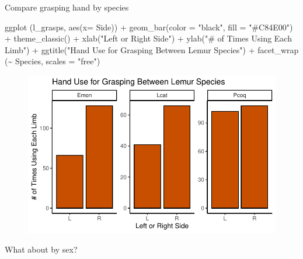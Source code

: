 \documentclass[
  letterpaper,
  DIV=11,
  numbers=noendperiod]{scrartcl}
\newenvironment{Shaded}{\begin{snugshade}}{\end{snugshade}}
\newcommand{\AttributeTok}[1]{\textcolor[rgb]{0.40,0.45,0.13}{#1}}
\newcommand{\FunctionTok}[1]{\textcolor[rgb]{0.28,0.35,0.67}{#1}}
\newcommand{\NormalTok}[1]{\textcolor[rgb]{0.00,0.23,0.31}{#1}}
\newcommand{\SpecialCharTok}[1]{\textcolor[rgb]{0.37,0.37,0.37}{#1}}
\newcommand{\StringTok}[1]{\textcolor[rgb]{0.13,0.47,0.30}{#1}}
\begin{document}
Compare grasping hand by species

\begin{Shaded}
\begin{Highlighting}[]
\FunctionTok{ggplot}\NormalTok{ (l\_grasps, }\FunctionTok{aes}\NormalTok{(}\AttributeTok{x=}\NormalTok{ Side)) }\SpecialCharTok{+}
  \FunctionTok{geom\_bar}\NormalTok{(}\AttributeTok{color =} \StringTok{"black"}\NormalTok{, }\AttributeTok{fill =} \StringTok{"\#C84E00"}\NormalTok{) }\SpecialCharTok{+}
  \FunctionTok{theme\_classic}\NormalTok{() }\SpecialCharTok{+}
  \FunctionTok{xlab}\NormalTok{(}\StringTok{"Left or Right Side"}\NormalTok{) }\SpecialCharTok{+}
  \FunctionTok{ylab}\NormalTok{(}\StringTok{"\# of Times Using Each Limb"}\NormalTok{) }\SpecialCharTok{+}
  \FunctionTok{ggtitle}\NormalTok{(}\StringTok{"Hand Use for Grasping Between Lemur Species"}\NormalTok{) }\SpecialCharTok{+}
  \FunctionTok{facet\_wrap}\NormalTok{ (}\SpecialCharTok{\textasciitilde{}}\NormalTok{ Species, }\AttributeTok{scales =} \StringTok{"free"}\NormalTok{)}
\end{Highlighting}
\end{Shaded}

\begin{figure}[H]

{\centering \includegraphics{LeftyLemurs_files/figure-pdf/unnamed-chunk-28-1.pdf}

}

\end{figure}

What about by sex?
\end{document}

